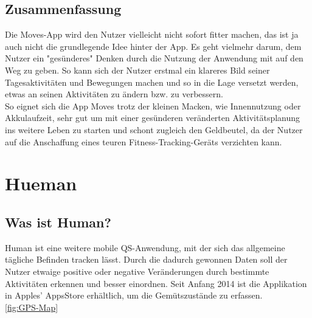 \subsection{Zusammenfassung}
\label{ch:Apps:sec:Moves:subsec:VERDICT} 

Die Moves-App wird den Nutzer vielleicht nicht sofort fitter machen, das ist ja auch nicht die grundlegende Idee hinter der App. 
Es geht vielmehr darum, dem Nutzer ein "gesünderes" Denken durch die Nutzung der Anwendung mit auf den Weg zu geben. 
So kann sich der Nutzer erstmal ein klareres Bild seiner Tagesaktivitäten und Bewegungen machen und so in die Lage versetzt werden, etwas an seinen Aktivitäten zu ändern bzw. zu verbessern.
\\
So eignet sich die App Moves trotz der kleinen Macken, wie Innennutzung oder Akkulaufzeit, sehr gut um mit einer gesünderen veränderten Aktivitätsplanung ins weitere Leben zu starten und schont zugleich den Geldbeutel, da der Nutzer auf die Anschaffung eines teuren Fitness-Tracking-Geräts verzichten kann.

\section{Hueman}
\label{ch:Apps:sec:Hueman}

\subsection{Was ist Human?}
\label{ch:Apps:sec:Moves:subsec:WIH}

Human ist eine weitere mobile QS-Anwendung, mit der sich das allgemeine tägliche Befinden tracken lässt. 
Durch die dadurch gewonnen Daten soll der Nutzer etwaige positive oder negative Veränderungen durch bestimmte Aktivitäten erkennen und besser einordnen.
Seit Anfang 2014 ist die Applikation in Apples' AppsStore erhältlich, um die Gemütszustände zu erfassen.
\\
\ref{fig:GPS-Map}

